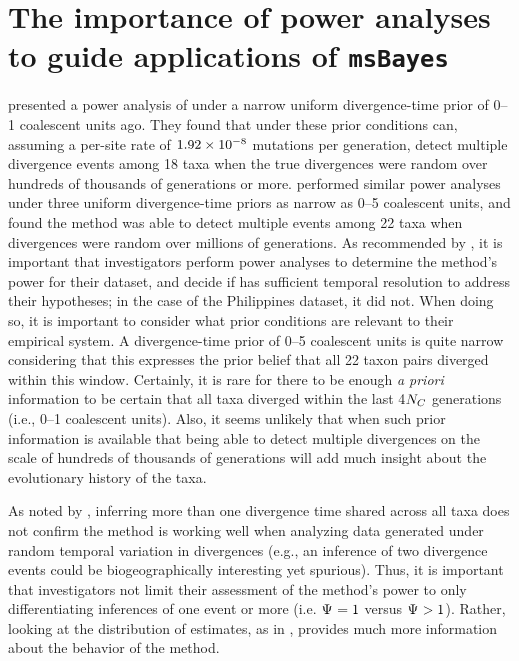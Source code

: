\section{The importance of power analyses to guide applications of \texttt{msBayes}}
\citet{Hickerson2013} presented a power analysis of \msb under a narrow uniform
divergence-time prior of 0--1 coalescent units ago.
They found that under these prior conditions \msb can, assuming a
per-site rate of $1.92\times 10^{-8}$ mutations per generation, detect multiple
divergence events among 18 taxa when the true divergences were random over
hundreds of thousands of generations or more.
\citet{Oaks2012} performed similar power analyses under three uniform
divergence-time priors as narrow as 0--5 coalescent units, and found the method
was able to detect multiple events among 22 taxa when divergences were random
over millions of generations.
As recommended by \citet{Oaks2012}, it is important that investigators perform
power analyses to determine the method's power for their dataset, and decide if
\msb has sufficient temporal resolution to address their hypotheses; in the
case of the Philippines dataset, it did not.
When doing so, it is important to consider what prior conditions are
relevant to their empirical system.
A divergence-time prior of 0--5 coalescent units is quite narrow considering
that this expresses the prior belief that all 22 taxon pairs diverged within
this window.
Certainly, it is  rare for there to be enough \emph{a priori} information to
be certain that all taxa diverged within the last 4$N_C$ generations
(i.e., 0--1 coalescent units).
Also, it seems unlikely that when such prior information is available that
being able to detect multiple divergences on the scale of hundreds of thousands
of generations will add much insight about the evolutionary history of the
taxa.

As noted by \citet{Oaks2012}, inferring more than one divergence time
shared across all taxa does not confirm the method is working well when
analyzing data generated under random temporal variation in divergences (e.g.,
an inference of two divergence events could be biogeographically interesting
yet spurious).
Thus, it is important that investigators not limit their assessment of the
method's power to only differentiating inferences of one event or more (i.e.
$\Psi_{} = 1$ versus $\Psi_{} > 1$).
Rather, looking at the distribution of estimates, as in \citet{Oaks2012},
provides much more information about the behavior of the method.



